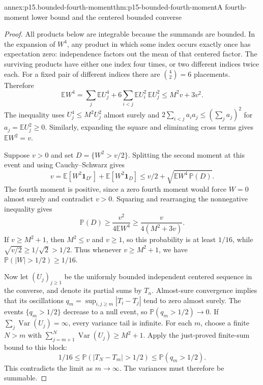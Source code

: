 \begin{annexitem}{annex:p15.bounded-fourth-moment}{thm:p15-bounded-fourth-moment}{A fourth-moment lower bound and the centered bounded converse}
\begin{proof}
All products below are integrable because the summands are bounded.
In the expansion of \(W^4\), any product in which some index occurs
exactly once has expectation zero: independence factors out the mean
of that centered factor. The surviving products have either one index
four times, or two different indices twice each. For a fixed pair of
different indices there are \(\binom42=6\) placements. Therefore
\[
 \mathbb EW^4
   =\sum_j\mathbb EU_j^4
       +6\sum_{i<j}\mathbb EU_i^2\,\mathbb EU_j^2
   \leq M^2v+3v^2.
\]
The inequality uses \(U_j^4\leq M^2U_j^2\) almost surely and
\(2\sum_{i<j}a_ia_j\leq(\sum_ja_j)^2\) for
\(a_j=\mathbb EU_j^2\geq0\). Similarly, expanding the square
and eliminating cross terms gives \(\mathbb EW^2=v\).

Suppose \(v>0\) and set \(D=\{W^2>v/2\}\). Splitting the
second moment at this event and using Cauchy--Schwarz gives
\[
 v=\mathbb E[W^2\mathbf1_{D^c}]+
                     \mathbb E[W^2\mathbf1_D]
   \leq v/2+\sqrt{\mathbb EW^4\,\mathbb P(D)}.
\]
The fourth moment is positive, since a zero fourth moment would force
\(W=0\) almost surely and contradict \(v>0\). Squaring and
rearranging the nonnegative inequality gives
\[
 \mathbb P(D)\geq\frac{v^2}{4\mathbb EW^4}
                  \geq\frac{v}{4(M^2+3v)}.
\]
If \(v\geq M^2+1\), then \(M^2\leq v\) and \(v\geq1\),
so this probability is at least \(1/16\), while
\(\sqrt{v/2}\geq1/\sqrt2>1/2\). Thus whenever
\(v\geq M^2+1\), we have \(\mathbb P(|W|>1/2)\geq1/16\).

Now let \((U_j)_{j\geq1}\) be the uniformly bounded independent
centered sequence in the converse, and denote its partial sums by
\(T_n\). Almost-sure convergence implies that its oscillations
\(q_m=\sup_{i,j\geq m}|T_i-T_j|\) tend to zero almost surely.
The events \(\{q_m>1/2\}\) decrease to a null event, so
\(\mathbb P(q_m>1/2)\to0\).
If \(\sum_j\operatorname{Var}(U_j)=\infty\), every variance
tail is infinite. For each \(m\), choose a finite \(N>m\) with
\(\sum_{j=m+1}^N\operatorname{Var}(U_j)\geq M^2+1\).
Apply the just-proved finite-sum bound to this block:
\[
 1/16\leq\mathbb P(|T_N-T_m|>1/2)
                  \leq\mathbb P(q_m>1/2).
\]
This contradicts the limit as \(m\to\infty\). The variances
must therefore be summable.
\end{proof}
\end{annexitem}

